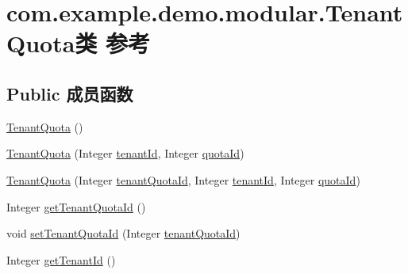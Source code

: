 \hypertarget{classcom_1_1example_1_1demo_1_1modular_1_1_tenant_quota}{}\section{com.\+example.\+demo.\+modular.\+Tenant\+Quota类 参考}
\label{classcom_1_1example_1_1demo_1_1modular_1_1_tenant_quota}
\subsection*{Public 成员函数}
\begin{DoxyCompactItemize}
\item 
\mbox{\hyperlink{classcom_1_1example_1_1demo_1_1modular_1_1_tenant_quota_a0b5a828ee24c432901a23f28cbda3989}{Tenant\+Quota}} ()
\item 
\mbox{\hyperlink{classcom_1_1example_1_1demo_1_1modular_1_1_tenant_quota_ab51c48fd11ce199437662946c73ca7c9}{Tenant\+Quota}} (Integer \mbox{\hyperlink{classcom_1_1example_1_1demo_1_1modular_1_1_tenant_quota_a2a36a0f31f76f7907d0f0c56ebc01f9d}{tenant\+Id}}, Integer \mbox{\hyperlink{classcom_1_1example_1_1demo_1_1modular_1_1_tenant_quota_a7e5032daf54dc992fdfdd992aa631bd5}{quota\+Id}})
\item 
\mbox{\hyperlink{classcom_1_1example_1_1demo_1_1modular_1_1_tenant_quota_a585b4c86b932f3592cec51fbb0360740}{Tenant\+Quota}} (Integer \mbox{\hyperlink{classcom_1_1example_1_1demo_1_1modular_1_1_tenant_quota_aea2751cc734fab6627496734fada822b}{tenant\+Quota\+Id}}, Integer \mbox{\hyperlink{classcom_1_1example_1_1demo_1_1modular_1_1_tenant_quota_a2a36a0f31f76f7907d0f0c56ebc01f9d}{tenant\+Id}}, Integer \mbox{\hyperlink{classcom_1_1example_1_1demo_1_1modular_1_1_tenant_quota_a7e5032daf54dc992fdfdd992aa631bd5}{quota\+Id}})
\item 
Integer \mbox{\hyperlink{classcom_1_1example_1_1demo_1_1modular_1_1_tenant_quota_aa2aaa12c0ee73e357abfa13d93771650}{get\+Tenant\+Quota\+Id}} ()
\item 
void \mbox{\hyperlink{classcom_1_1example_1_1demo_1_1modular_1_1_tenant_quota_aa5d333450703b46cede66a2b8cbf4d2d}{set\+Tenant\+Quota\+Id}} (Integer \mbox{\hyperlink{classcom_1_1example_1_1demo_1_1modular_1_1_tenant_quota_aea2751cc734fab6627496734fada822b}{tenant\+Quota\+Id}})
\item 
Integer \mbox{\hyperlink{classcom_1_1example_1_1demo_1_1modular_1_1_tenant_quota_af88f0099d8830b11770435bd2b0e8cea}{get\+Tenant\+Id}} ()
\item 

\end{DoxyCompactItemize}
